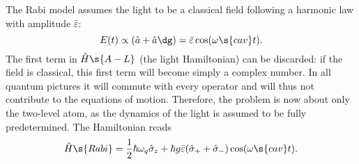 \documentclass[fontsize=9pt,twoside=semi,bookmarkpackage=false]{scrartcl}
\renewcommand{\hbar}{\hslash}
\begin{document}
The Rabi model assumes the light to be a classical field following a harmonic law with amplitude $\bar \varepsilon$:
\begin{equation}
   E(t) \propto ( \hat a + \hat a\dg ) = \bar \varepsilon \cos ( \omega\s{cav} t  ).
\end{equation}
The first term in $\hat H\s{A-L}$ (the light Hamiltonian) can be discarded: if the field is classical, this first term will become simply a complex number.
In all quantum pictures it will commute with every operator and will thus not contribute to the equations of motion.
Therefore, the problem is now about only the two-level atom, as the dynamics of the light is assumed to be fully predetermined.
The Hamiltonian reads
\begin{equation}
  \hat H\s{Rabi}
  = \frac{ 1 }{ 2 } \hbar \omega_q \hat \sigma_z
  + \hbar g \bar \varepsilon ( \hat \sigma_+ + \hat \sigma_- ) \cos ( \omega\s{cav} t ).
\end{equation}
\end{document}

